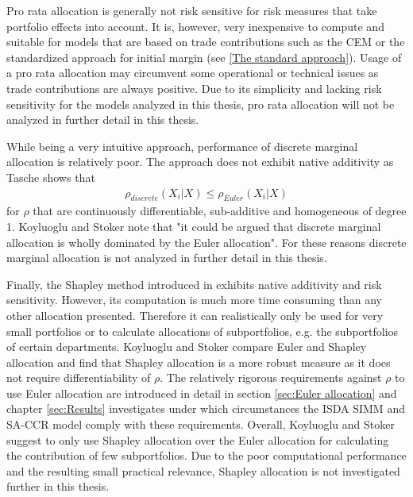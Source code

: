 \documentclass[../Thesis_AHoecherl.tex]{subfiles}
\begin{document}
Pro rata allocation is generally not risk sensitive for risk measures that take portfolio effects into account.
It is, however, very inexpensive to compute and suitable for models that are based on trade contributions such as the \gls{CEM} or the standardized approach for initial margin (see \ref{The standard approach}).
Usage of a pro rata allocation may circumvent some operational or technical issues as trade contributions are always positive.
Due to its simplicity and lacking risk sensitivity for the models analyzed in this thesis, pro rata allocation will not be analyzed in further detail in this thesis.

While being a very intuitive approach, performance of discrete marginal allocation is relatively poor. The approach does not exhibit native additivity as Tasche \cite{tasche2007} shows that 
\begin{align*}
    \rho_{discrete}\left(X_i|X\right) \leq \rho_{Euler}\left(X_i|X\right)
\end{align*}
for $\rho$ that are continuously differentiable, sub-additive and homogeneous of degree 1. 
Koyluoglu and Stoker \cite{koyluoglu2002risk} note that "it could be argued that discrete marginal allocation is wholly dominated by the Euler allocation". For these reasons discrete marginal allocation is not analyzed in further detail in this thesis.

Finally, the Shapley method introduced in \cite{shapley1951} exhibits native additivity and risk sensitivity.
However, its computation is much more time consuming than any other allocation presented. 
Therefore it can realistically only be used for very small portfolios or to calculate allocations of subportfolios, e.g. the subportfolios of certain departments.
Koyluoglu and Stoker \cite{koyluoglu2002risk} compare Euler and Shapley allocation and find that Shapley allocation is a more robust measure as it does not require differentiability of $\rho$. The relatively rigorous requirements against $\rho$ to use Euler allocation are introduced in detail in section \ref{sec:Euler allocation} and chapter \ref{sec:Results} investigates under which circumstances the \gls{ISDA SIMM} and SA-CCR model comply with these requirements.
Overall, Koyluoglu and Stoker suggest to only use Shapley allocation over the Euler allocation for calculating the contribution of few subportfolios.
Due to the poor computational performance and the resulting small practical relevance, Shapley allocation is not investigated further in this thesis.
\end{document}
